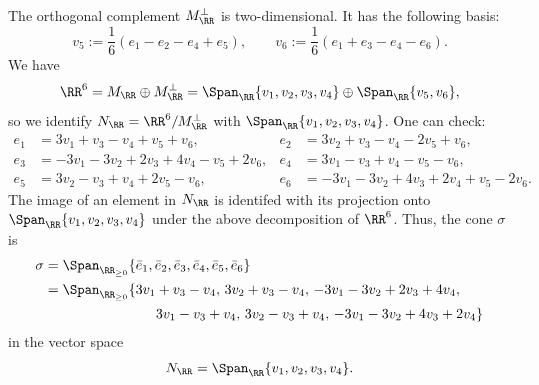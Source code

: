 \documentclass[12pt]{amsart}
\theoremstyle{plain}
\begin{document}
The orthogonal complement $M_\RR^\perp$ is two-dimensional.
It has the following basis:
$$v_5 :=\frac{1}{6}(e_1-e_2-e_4+e_5), \qquad v_6 := \frac{1}{6} (e_1 + e_3 -e_4 - e_6).$$
We have
$$\RR^6 = M_\RR \oplus M_\RR^\perp = \Span_\RR\{v_1, v_2, v_3, v_4\} \oplus \Span_{\RR}\{v_5, v_6\},$$
so we identify $N_\RR = \RR^6 / M_\RR^\perp$ with $\Span_\RR\{v_1, v_2, v_3, v_4\}$.
One can check:
\begin{align*}
	e_1 &= 3v_1 + v_3 - v_4 +v_5+v_6, & e_2 &= 3v_2+v_3-v_4-2v_5+v_6,  \\
	e_3 &= -3v_1-3v_2+2v_3+4v_4-v_5+2v_6,  & e_4 &= 3v_1-v_3+v_4-v_5-v_6, \\
	e_5 &= 3v_2-v_3+v_4+2v_5-v_6, & e_6 &= -3v_1-3v_2+4v_3+2v_4+v_5-2v_6.
\end{align*}
The image of an element in $N_\RR$ is identifed with its projection onto $\Span_\RR\{v_1, v_2, v_3, v_4\}$ under the above decomposition of $\RR^6$.
Thus, the cone $\sigma$ is
\begin{align*}
	\sigma &= \Span_{\RR_{\ge 0}}\{ \bar e_1, \bar e_2, \bar e_3, \bar e_4, \bar e_5, \bar e_6 \} \\
		&= \Span_{\RR_{\ge 0}} \{3v_1 + v_3 - v_4,\,  3v_2+v_3-v_4,\,  -3v_1-3v_2+2v_3+4v_4, \\
		&\qquad\qquad\qquad\qquad  3v_1-v_3+v_4,\,   3v_2-v_3+v_4, \, -3v_1-3v_2+4v_3+2v_4 \}
\end{align*}
in the vector space
$$N_\RR = \Span_\RR\{v_1, v_2, v_3 , v_4\}.$$
\end{document}
